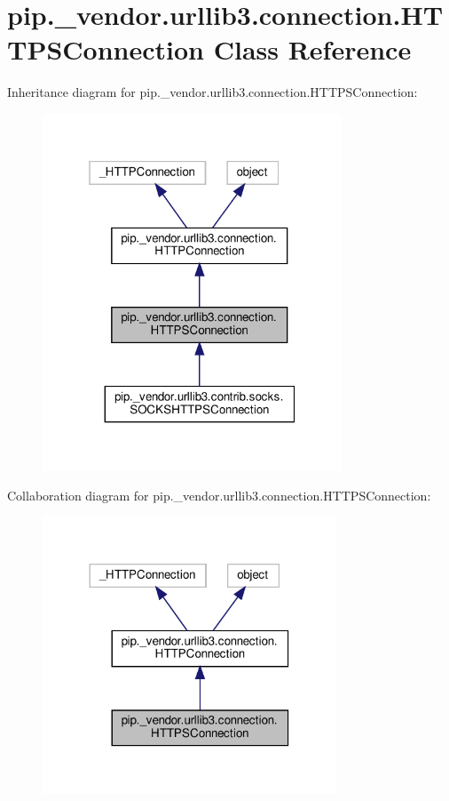 \hypertarget{classpip_1_1__vendor_1_1urllib3_1_1connection_1_1HTTPSConnection}{}\section{pip.\+\_\+vendor.\+urllib3.\+connection.\+H\+T\+T\+P\+S\+Connection Class Reference}
\label{classpip_1_1__vendor_1_1urllib3_1_1connection_1_1HTTPSConnection}


Inheritance diagram for pip.\+\_\+vendor.\+urllib3.\+connection.\+H\+T\+T\+P\+S\+Connection\+:
\nopagebreak
\begin{figure}[H]
\begin{center}
\leavevmode
\includegraphics[width=253pt]{classpip_1_1__vendor_1_1urllib3_1_1connection_1_1HTTPSConnection__inherit__graph}
\end{center}
\end{figure}


Collaboration diagram for pip.\+\_\+vendor.\+urllib3.\+connection.\+H\+T\+T\+P\+S\+Connection\+:
\nopagebreak
\begin{figure}[H]
\begin{center}
\leavevmode
\includegraphics[width=248pt]{classpip_1_1__vendor_1_1urllib3_1_1connection_1_1HTTPSConnection__coll__graph}
\end{center}
\end{figure}
